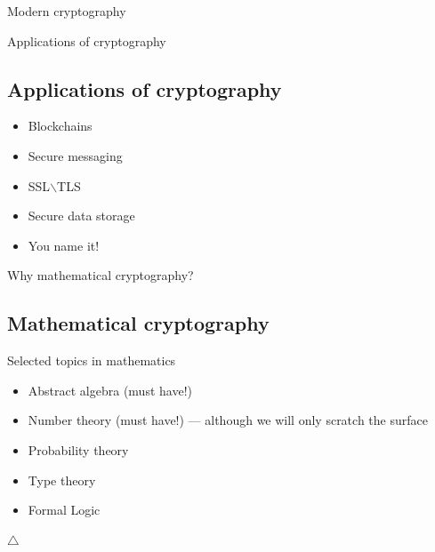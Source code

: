 \documentclass{beamer}
\begin{document}
\begin{frame}{Modern cryptography}
    \begin{center}
    \begin{minipage}{0.45\linewidth}
    \end{minipage}
    \hfill
    \begin{minipage}{0.5\linewidth}
    \end{minipage}
    \end{center}
\end{frame}

\begin{frame}{Applications of cryptography}
    \subsection{Applications of cryptography}
    \begin{itemize}
        \item Blockchains
        \item Secure messaging
        \item SSL$\backslash$TLS
        \item Secure data storage
        \item You name it!
    \end{itemize}
\end{frame}

\begin{frame}{Why mathematical cryptography?}
    \subsection{Mathematical cryptography}
    Selected topics in mathematics
    \begin{itemize}
        \item Abstract algebra (must have!)
        \item Number theory (must have!) --- although we will only scratch the 
            surface
        \item Probability theory
        \item Type theory
        \item Formal Logic
    \end{itemize}
	$\triangle$
\end{frame}

\end{document}
